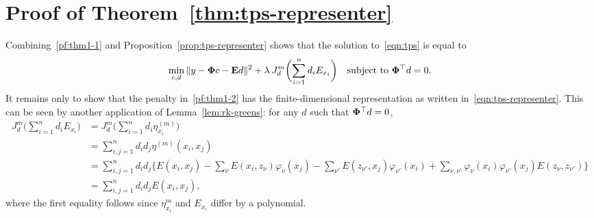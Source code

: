 \documentclass{article}
\newcommand{\1}{\mathbf{1}}
\begin{document}
\section{Proof of Theorem~\ref{thm:tps-representer}}
Combining~\eqref{pf:thm1-1} and Proposition~\ref{prop:tps-representer} shows that the solution to~\eqref{eqn:tps} is equal to
\begin{equation}
\label{pf:thm1-2}
\min_{c,d} \|y - {\bf \Phi} c - {\bf E} d\|^2 + \lambda \hspace{2 pt} J_d^m\biggl(\sum_{i = 1}^{n} d_i E_{x_i}\biggr) \quad \textrm{subject to ${\bf \Phi}^{\top}d = 0$.}
\end{equation}
It remains only to show that the penalty in~\eqref{pf:thm1-2} has the finite-dimensional representation as written in~\eqref{eqn:tps-representer}. This can be seen by another application of Lemma~\ref{lem:rk-greens}: for any $d$ such that ${\bf \Phi}^{\top} d = 0$,
\begin{align*}
J_d^m\biggl(\sum_{i = 1}^{n} d_i E_{x_i}\biggr) & = J_d^m\biggl(\sum_{i = 1}^{n} d_i \eta_{x_i}^{(m)}\biggr) \\
& = \sum_{i,j = 1}^{n} d_i d_j \eta^{(m)}(x_i,x_j) \\
& = \sum_{i,j = 1}^{n} d_i d_j \biggl\{E(x_i,x_j) -  \sum_{\nu} E(x_i,z_{\nu}) \varphi_{\nu}(x_j) - \sum_{\nu'} E(z_{\nu'},x_j) \varphi_{\nu'}(x_i) + \sum_{\nu,\nu'} \varphi_{\nu}(x_i) \varphi_{\nu'}(x_j) E(z_{\nu},z_{\nu'}) \biggr\} \\
& = \sum_{i,j = 1}^{n} d_i d_j E(x_i,x_j),
\end{align*}
where the first equality follows since $\eta_{x_i}^{m}$ and $E_{x_i}$ differ by a polynomial.


 
\end{document}
